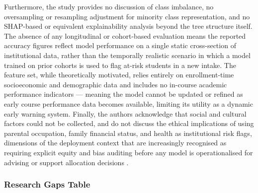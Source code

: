 \documentclass[12pt]{report}
\begin{document}
Furthermore, the study provides no discussion of class imbalance, no oversampling or resampling adjustment for minority
 class representation, and no SHAP-based or equivalent explainability analysis beyond the tree structure itself. The 
 absence of any longitudinal or cohort-based evaluation means the reported accuracy figures reflect model performance
  on a single static cross-section of institutional data, rather than the temporally realistic scenario in which a model
   trained on prior cohorts is used to flag at-risk students in a new intake. The feature set, while theoretically motivated, 
   relies entirely on enrollment-time socioeconomic and demographic data and includes no in-course academic performance 
   indicators --- meaning the model cannot be updated or refined as early course performance data becomes available, 
   limiting its utility as a dynamic early warning system. Finally, the authors acknowledge that social and cultural
    factors could not be collected, and do not discuss the ethical implications of using parental occupation, family 
    financial status, and health as institutional risk flags, dimensions of the deployment context that are increasingly
     recognised as requiring explicit equity and bias auditing before any model is operationalised for advising or support
      allocation decisions \parencite{Ngemu2015}.



\subsubsection{Research Gaps Table}
\end{document}
